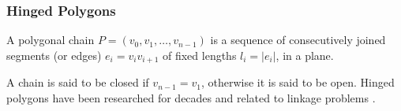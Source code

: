 % 
\subsubsection{Hinged Polygons}
\begin{definition}\label{def}
A polygonal chain $P = \left( v_0, v_1, \dots, v_{n-1}\right) $ is a sequence of
consecutively joined segments (or edges) $e_i = v_i v_{i+1}$ of fixed lengths
$l_i = \left\vert e_i\right\vert $, in a plane. \cite{Biedl99lockedand}
\end{definition}
A chain is said to be closed if $v_{n-1} = v_1$, otherwise it is said to be
open. Hinged polygons have been researched for decades and related to linkage problems
\cite{Biedl99lockedand,canny1988complexity}.

